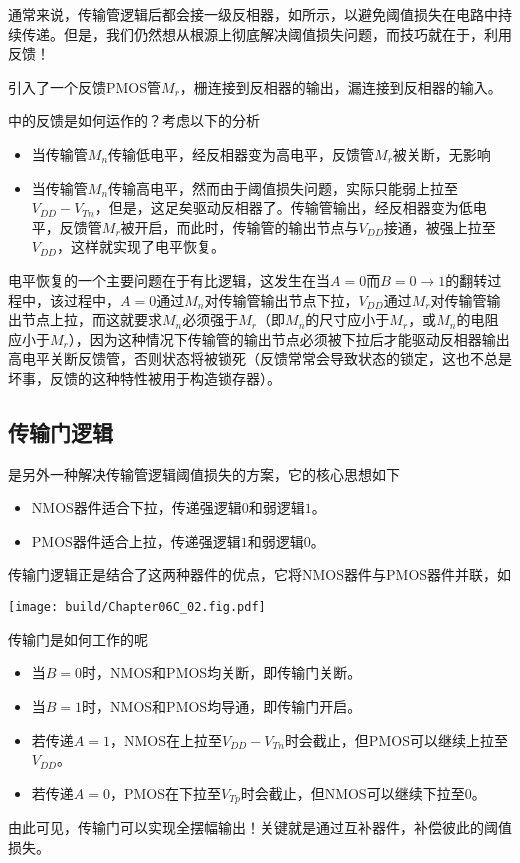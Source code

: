 通常来说，传输管逻辑后都会接一级反相器，如所示，以避免阈值损失在电路中持续传递。但是，我们仍然想从根源上彻底解决阈值损失问题，而技巧就在于，利用反馈！

引入了一个反馈PMOS管$M_r$，栅连接到反相器的输出，漏连接到反相器的输入。\goodbreak

中的反馈是如何运作的？考虑以下的分析\nopagebreak
\begin{itemize}
    \item 当传输管$M_n$传输低电平，经反相器变为高电平，反馈管$M_r$被关断，无影响
    \item 当传输管$M_n$传输高电平，然而由于阈值损失问题，实际只能弱上拉至$V_{DD}-V_{Tn}$，但是，这足矣驱动反相器了。传输管输出，经反相器变为低电平，反馈管$M_r$被开启，而此时，传输管的输出节点与$V_{DD}$接通，被强上拉至$V_{DD}$，这样就实现了电平恢复。
\end{itemize}
电平恢复的一个主要问题在于有比逻辑，这发生在当$A=0$而$B=0\to 1$的翻转过程中，该过程中，$A=0$通过$M_n$对传输管输出节点下拉，$V_{DD}$通过$M_r$对传输管输出节点上拉，而这就要求$M_n$必须强于$M_r$（即$M_n$的尺寸应小于$M_r$，或$M_n$的电阻应小于$M_r$），因为这种情况下传输管的输出节点必须被下拉后才能驱动反相器输出高电平关断反馈管，否则状态将被锁死（反馈常常会导致状态的锁定，这也不总是坏事，反馈的这种特性被用于构造锁存器）。

\subsection{传输门逻辑}
是另外一种解决传输管逻辑阈值损失的方案，它的核心思想如下
\begin{itemize}
    \item NMOS器件适合下拉，传递强逻辑$0$和弱逻辑$1$。
    \item PMOS器件适合上拉，传递强逻辑$1$和弱逻辑$0$。
\end{itemize}
传输门逻辑正是结合了这两种器件的优点，它将NMOS器件与PMOS器件并联，如
\begin{Figure}[传输门的基本原理]
    \texttt{[image: build/Chapter06C\_02.fig.pdf]}
\end{Figure}
传输门是如何工作的呢
\begin{itemize}
    \item 当$B=0$时，NMOS和PMOS均关断，即传输门关断。
    \item 当$B=1$时，NMOS和PMOS均导通，即传输门开启。
    \item 若传递$A=1$，NMOS在上拉至$V_{DD}-V_{Tn}$时会截止，但PMOS可以继续上拉至$V_{DD}$。
    \item 若传递$A=0$，PMOS在下拉至$V_{Tp}$时会截止，但NMOS可以继续下拉至$0$。
\end{itemize}
由此可见，传输门可以实现全摆幅输出！关键就是通过互补器件，补偿彼此的阈值损失。\goodbreak

